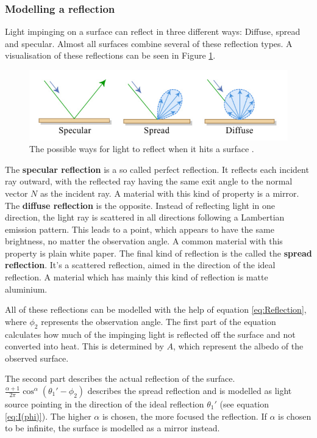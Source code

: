 \subsubsection{Modelling a reflection}
Light impinging on a surface can reflect in three different ways: Diffuse, spread and specular. Almost all surfaces combine several of these reflection types. A visualisation of these reflections can be seen in Figure \ref{fig:phong}.
\begin{figure}
	\includegraphics[width=\textwidth]{pics/3_reflections.png}
	\caption{The possible ways for light to reflect when it hits a surface \cite{3reflections}.\label{fig:phong}}
\end{figure}
The \textbf{specular reflection} is a so called perfect reflection. It reflects each incident ray outward, with the reflected ray having the same exit angle to the normal vector $N$ as the incident ray. A material with this kind of property is a mirror. The \textbf{diffuse reflection} is the opposite. Instead of reflecting light in one direction, the light ray is scattered in all directions following a Lambertian emission pattern. This leads to a point, which appears to have the same brightness, no matter the observation angle. A common material with this property is plain white paper. The final kind of reflection is the called the \textbf{spread reflection}. It's a scattered reflection, aimed in the direction of the ideal reflection. A material which has mainly this kind of reflection is matte aluminium.

All of these reflections can be modelled with the help of equation \ref{eq:Reflection}, where $\phi_2$ represents the observation angle. The first part of the equation calculates how much of the impinging light is reflected off the surface and not converted into heat. This is determined by $A$, which represent the albedo of the observed surface. 

The second part describes the actual reflection of the surface. $\frac{\alpha+1}{2\pi}\cos^\alpha(\theta_1'-\phi_2)$ describes the spread reflection and is modelled as light source pointing in the direction of the ideal reflection $\theta_1'$ (see equation \ref{eq:I(phi)}). The higher $\alpha$ is chosen, the more focused the reflection. If $\alpha$ is chosen to be infinite, the surface is modelled as a mirror instead.

